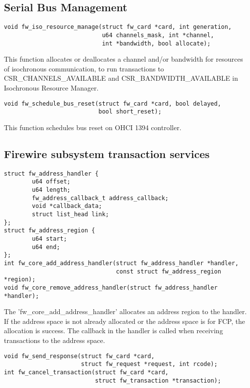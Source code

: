 \documentclass[onecolumn]{article}
\begin{document}
\subsection{Serial Bus Management}

\begin{verbatim}
void fw_iso_resource_manage(struct fw_card *card, int generation,
                            u64 channels_mask, int *channel,
                            int *bandwidth, bool allocate);
\end{verbatim}

This function allocates or deallocates a channel and/or bandwidth for resources of isochronous communication, to run transactions to CSR\_CHANNELS\_AVAILABLE and CSR\_BANDWIDTH\_AVAILABLE in Isochronous Resource Manager.

\begin{verbatim}
void fw_schedule_bus_reset(struct fw_card *card, bool delayed,
                           bool short_reset);
\end{verbatim}

This function schedules bus reset on OHCI 1394 controller.

\subsection{Firewire subsystem transaction services}

\begin{verbatim}
struct fw_address_handler {
        u64 offset;
        u64 length;
        fw_address_callback_t address_callback;
        void *callback_data;
        struct list_head link;
};
struct fw_address_region {
        u64 start;
        u64 end;
};
int fw_core_add_address_handler(struct fw_address_handler *handler,
                                const struct fw_address_region *region);
void fw_core_remove_address_handler(struct fw_address_handler *handler);
\end{verbatim}

The 'fw\_core\_add\_address\_handler' allocates an address region to the handler. If the address space is not already allocated or the address space is for FCP, the allocation is success. The callback in the handler is called when receiving transactions to the address space.

\begin{verbatim}
void fw_send_response(struct fw_card *card,
                      struct fw_request *request, int rcode);
int fw_cancel_transaction(struct fw_card *card,
                          struct fw_transaction *transaction);
\end{verbatim}
\end{document}
